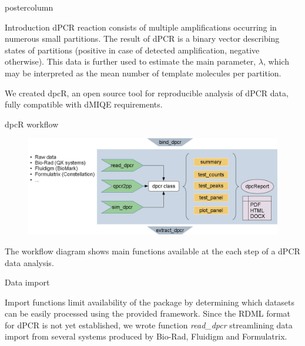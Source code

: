 \documentclass[final]{beamer}\usepackage[]{graphicx}\usepackage[]{color}
\newlength{\columnheight}
\begin{document}
\begin{frame}
  \begin{columns}
    \begin{column}{.46\textwidth}
      \begin{beamercolorbox}[center,wd=\textwidth]{postercolumn}
        \begin{minipage}[T]{.95\textwidth}
          \parbox[t][\columnheight]{\textwidth}
            {
    
        
    \begin{block}{Introduction}
      dPCR reaction consists of multiple amplifications occurring in numerous small partitions. The result of dPCR is a binary vector describing states of partitions (positive in case of detected amplification, negative otherwise). This data is further used to estimate the main parameter, $\lambda$, which may be interpreted as the mean number of template molecules per partition.
      
      We created dpcR, an open source tool for reproducible analysis of dPCR data, fully compatible with dMIQE requirements.
    \end{block}
    
    \vfill
    
    \begin{block}{dpcR workflow}

      \begin{figure}
\begin{center}
\includegraphics{figures/dpcR_framework.png}
\end{center}
\label{workflow}
\end{figure}

The workflow diagram shows main functions available at the each step of a dPCR data analysis.

    \end{block}
    \vfill
    
    
    \begin{block}{Data import}

Import functions limit availability of the package by determining which datasets 
can be easily processed using the provided framework. Since the RDML format for 
dPCR is not yet established, we wrote function 
\textit{read\_dpcr} streamlining data import from several systems produced by Bio-Rad, 
Fluidigm and Formulatrix. 


\end{block}}
\end{minipage}
\end{beamercolorbox}
\end{column}
\end{columns}
\end{frame}
\end{document}
